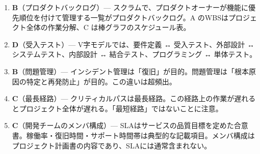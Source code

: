 \begin{enumerate}
  \item \textbf{B}（プロダクトバックログ）— スクラムで、プロダクトオーナーが機能に優先順位を付けて管理する一覧がプロダクトバックログ。A のWBSはプロジェクト全体の作業分解、C は棒グラフのスケジュール表。
  \item \textbf{D}（受入テスト）— V字モデルでは、要件定義 ↔ 受入テスト、外部設計 ↔ システムテスト、内部設計 ↔ 結合テスト、プログラミング ↔ 単体テスト。
  \item \textbf{B}（問題管理）— インシデント管理は「復旧」が目的。問題管理は「根本原因の特定と再発防止」が目的。この違いは超頻出。
  \item \textbf{C}（最長経路）— クリティカルパスは最長経路。この経路上の作業が遅れるとプロジェクト全体が遅れる。「最短経路」ではないことに注意。
  \item \textbf{C}（開発チームのメンバ構成）— SLAはサービスの品質目標を定めた合意書。稼働率・復旧時間・サポート時間帯は典型的な記載項目。メンバ構成はプロジェクト計画書の内容であり、SLAには通常含まれない。
\end{enumerate}

